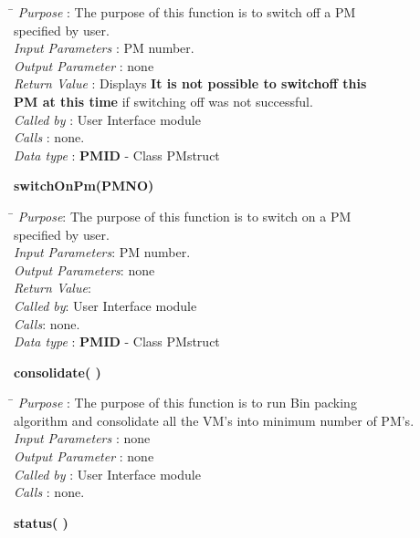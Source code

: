 \documentclass[a4paper,11pt]{article}
\begin{document}
\begin{itemize}
\begin{tabbing}
\hspace*{3.2cm}\= \kill
 \textit{Purpose} \> : The purpose of this function is to switch off a PM\\ \> specified by user.\\
  \textit{Input Parameters} \> : PM number. \\
  \textit{Output Parameter} \> : none \\
  \textit{Return Value} \> : Displays \textbf{It is not possible to switchoff this } \\ \>\textbf{PM at this time} if switching off was not successful. \\
  \textit{Called by} \> : User Interface module \\
  \textit{Calls} \> : none.\\
  \textit{Data type} \> : \textbf{PM\textunderscore ID} - Class PMstruct
\end{tabbing}
\textbf{switchOnPm(PM\textunderscore NO)}
\begin{tabbing}
\hspace*{3.2cm}\=\kill
\textit{Purpose}\>: The purpose of this function is to switch on a PM \\ \>specified by user. \\
\textit{Input Parameters}\>: PM number.\\
\textit{Output Parameters}\>: none\\
\textit{Return Value}\>:\\
\textit{Called by}\>: User Interface module\\
\textit{Calls}\>: none.\\
\textit{Data type} \> : \textbf{PM\textunderscore ID} - Class PMstruct
\end{tabbing}
\pagebreak
\textbf{consolidate( )}
  
\begin{tabbing}
\hspace*{3.2cm}\= \kill
 \textit{Purpose} \> : The purpose of this function is to run Bin packing\\ \> algorithm and consolidate all the VM's into minimum number of PM's.\\
  \textit{Input Parameters} \> : none \\
  \textit{Output Parameter} \> : none \\
    \textit{Called by} \> : User Interface module \\
  \textit{Calls} \> : none.\\
\end{tabbing}
\textbf{status( )}
  

\end{itemize}
\end{document}
